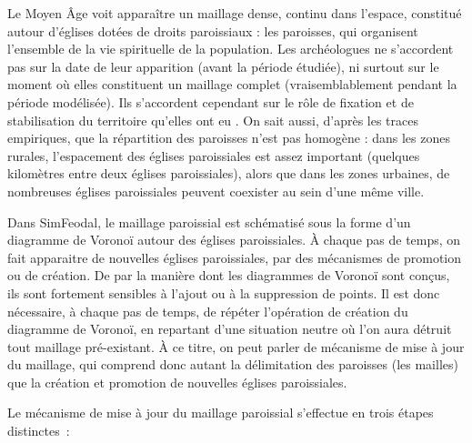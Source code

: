 Le Moyen Âge voit apparaître un maillage dense, continu dans l'espace, constitué autour d'églises dotées de droits paroissiaux : les paroisses, qui organisent l'ensemble de la vie spirituelle de la population.
Les archéologues ne s'accordent pas sur la date de leur apparition (avant la période étudiée), ni surtout sur le moment où elles constituent un maillage complet (vraisemblablement pendant la période modélisée).
Ils s'accordent cependant sur le rôle de fixation et de stabilisation du territoire qu'elles ont eu \autocite{zadora-rio_paroisses_2008}.
On sait aussi, d'après les traces empiriques, que la répartition des paroisses n'est pas homogène : dans les zones rurales, l'espacement des églises paroissiales est assez important (quelques kilomètres entre deux églises paroissiales), alors que dans les zones urbaines, de nombreuses églises paroissiales peuvent coexister au sein d'une même ville.

\begin{tcolorbox}[breakable,left=0pt,right=0pt,top=0pt,bottom=0pt,
	colback=gray!15,colframe=gray!15,width=\dimexpr\textwidth\relax, 
	enlarge left by=0mm, boxsep=5pt,arc=0pt,outer arc=0pt]
	Dans SimFeodal, le maillage paroissial est schématisé sous la forme d'un diagramme de Voronoï autour des églises paroissiales.
	À chaque pas de temps, on fait apparaitre de nouvelles églises paroissiales, par des mécanismes de promotion ou de création.
	De par la manière dont les diagrammes de Voronoï sont conçus, ils sont fortement sensibles à l'ajout ou à la suppression de points.
	Il est donc nécessaire, à chaque pas de temps, de répéter l'opération de création du diagramme de Voronoï, en repartant d'une situation \og neutre\fg{} où l'on aura détruit tout maillage pré-existant.
	À ce titre, on peut parler de mécanisme de \og mise à jour\fg{} du maillage, qui comprend donc autant la délimitation des paroisses (les mailles) que la création et promotion de nouvelles églises paroissiales.
\end{tcolorbox}
	Le mécanisme de mise à jour du maillage paroissial s'effectue en trois étapes distinctes~:

